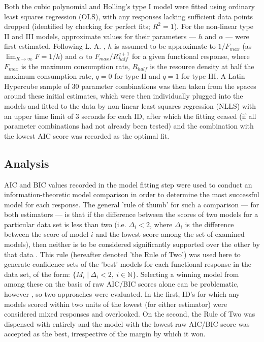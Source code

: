 \documentclass[11pt]{article}
\begin{document}
    Both the cubic polynomial and Holling's type I model were fitted using ordinary least squares regression (OLS), with any responses lacking sufficient data points dropped (identified by checking for perfect fits; $R^2=1$). For the non-linear type II and III models, approximate values for their parameters — $h$ and $\alpha$ — were first estimated. Following L. A. \citet{real1977kinetics}, $h$ is assumed to be approximate to $1/F_{max}$ (as $\lim_{R\to\infty}F=1/h$) and $\alpha$ to $F_{max}/R_{half}^{q+1}$ for a given functional response, where $F_{max}$ is the maximum consumption rate,  $R_{half}$ is the resource density at half the maximum consumption rate, $q=0$ for type II and $q=1$ for type III. A Latin Hypercube sample of 30 parameter combinations was then taken from the spaces around these initial estimates, which were then individually plugged into the models and fitted to the data by non-linear least squares regression (NLLS) with an upper time limit of 3 seconds for each ID, after which the fitting ceased (if all parameter combinations had not already been tested) and the combination with the lowest AIC score was recorded as the optimal fit.
    
    \subsection{Analysis}
    
    AIC and BIC values recorded in the model fitting step were used to conduct an information-theoretic model comparison in order to determine the most successful model for each response. The general 'rule of thumb' for such a comparison — for both estimators — is that if the difference between the scores of two models for a particular data set is less than two  (i.e.  $\Delta_i<2$, where $\Delta_i$ is the difference between the score of model $i$ and the lowest score among the set of examined models), then neither is to be considered significantly supported over the other by that data \citep{anderson2004model}. This rule (hereafter denoted 'the Rule of Two') was used here to generate confidence sets of the 'best' models for each functional response in the data set, of the form: $\{M_{i}\;|\:\Delta _{i} < 2,\:i\in\mathbb{N}\}$. Selecting a winning model from among these on the basis of raw AIC/BIC scores alone can be problematic, however \citep{wagenmakers2004aic}, so two approaches were evaluated. In the first, ID's for which any models scored within two units of the lowest (for either estimator) were considered mixed responses and overlooked. On the second, the Rule of Two was dispensed with entirely and the model with the lowest raw AIC/BIC score was accepted as the best, irrespective of the margin by which it won.
    
\end{document}
